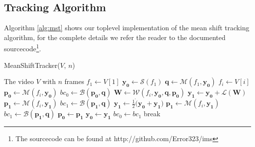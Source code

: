\documentclass[11pt]{article}
\begin{document}
\subsection{Tracking Algorithm}
Algorithm \ref{alg:mst} shows our toplevel implementation of the mean shift
tracking algorithm, for the complete details we refer the reader to the
documented sourcecode\footnote{The sourcecode can be found at http://github.com/Error323/ims}.
\begin{algorithm}
	\caption{MeanShiftTracker($V$, $n$)}
	\begin{algorithmic}[1]
	\REQUIRE The video $V$ with $n$ frames
	\STATE $f_1 \leftarrow V[1]$ 
	\STATE $\mathbf{y_0} \leftarrow \mathcal{S}(f_1)$ 
	\STATE $\mathbf{q} \leftarrow \mathcal{M}(f_1, \mathbf{y_0})$ 
		\STATE $f_i \leftarrow V[i]$
		\STATE $\mathbf{p_0} \leftarrow \mathcal{M}(f_i, \mathbf{y_0})$
		\STATE $bc_0 \leftarrow \mathcal{B}(\mathbf{p_0}, \mathbf{q})$ 
			\STATE $\mathbf{W} \leftarrow \mathcal{W}(f_i, \mathbf{y_0}, \mathbf{q}, \mathbf{p_0})$ 
			\STATE $\mathbf{y_1} \leftarrow \mathbf{y_0} + \mathcal{L}(\mathbf{W})$ 
			\STATE $\mathbf{p_1} \leftarrow \mathcal{M}(f_i, \mathbf{y_1})$
			\STATE $bc_1 \leftarrow \mathcal{B}(\mathbf{p_1}, \mathbf{q})$
				\STATE $\mathbf{y_1} \leftarrow \frac{1}{2} \dot (\mathbf{y_0} + \mathbf{y_1})$ 
				\STATE $\mathbf{p_1} \leftarrow \mathcal{M}(f_i, \mathbf{y_1})$
				\STATE $bc_1 \leftarrow \mathcal{B}(\mathbf{p_1}, \mathbf{q})$
			\ENDWHILE
			\STATE $\mathbf{p_0} \leftarrow \mathbf{p_1}$
			\STATE $\mathbf{y_0} \leftarrow \mathbf{y_1}$
			\STATE $bc_0 \leftarrow bc_1$
				\STATE break 
			\ENDIF
		\ENDWHILE
	\ENDFOR
	\medskip
	\end{algorithmic}
\label{alg:mst}
\end{algorithm}


\newpage
\end{document}
